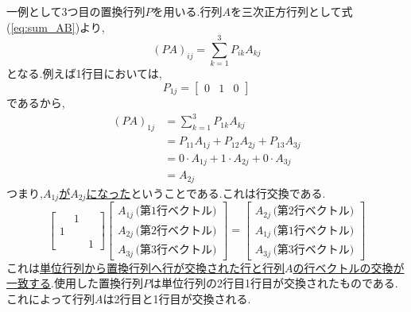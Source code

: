 一例として3つ目の置換行列$P$を用いる.行列$A$を三次正方行列として式(\ref{eq:sum_AB})より,
\[(PA)_{ij}=\sum_{k=1}^{3}P_{ik}A_{kj}\]
となる.例えば1行目においては,
\[P_{1j}=\begin{bmatrix}0 & 1 & 0\end{bmatrix}\]
であるから,
\begin{align*}
(PA)_{1j} & = \sum_{k=1}^{3}P_{1k}A_{kj} \\
          & = P_{11}A_{1j} + P_{12}A_{2j} + P_{13}A_{3j} \\
          & = 0\cdot A_{1j} + 1\cdot A_{2j} + 0\cdot A_{3j} \\
          & = A_{2j}
\end{align*}
つまり,\underline{$A_{1j}$が$A_{2j}$になった}ということである.これは行交換である.
\[
\begin{bmatrix}
    & 1 & \\
    1 & & \\
    & & 1 
\end{bmatrix}\begin{bmatrix}
    A_{1j}\,\text{(第1行ベクトル)}\\
    A_{2j}\,\text{(第2行ベクトル)}\\
    A_{3j}\,\text{(第3行ベクトル)}
\end{bmatrix}=
\begin{bmatrix}
    A_{2j}\,\text{(第2行ベクトル)}\\
    A_{1j}\,\text{(第1行ベクトル)}\\
    A_{3j}\,\text{(第3行ベクトル)}
\end{bmatrix}
\]
これは\underline{単位行列から置換行列へ行が交換された行と行列$A$の行ベクトルの交換が一致する}.使用した置換行列$P$は単位行列の2行目1行目が交換されたものである.
これによって行列$A$は2行目と1行目が交換される.

